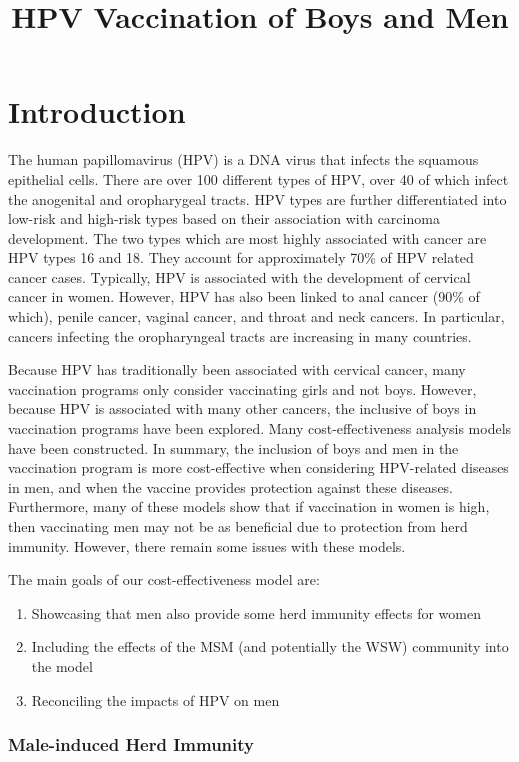 \documentclass[12pt]{article}
\title{HPV Vaccination of Boys and Men}
\begin{document}
\maketitle

\section{Introduction}


The human papillomavirus (HPV) is a DNA virus that infects the squamous epithelial cells.  There are over 100 different types of HPV, over 40 of which infect the anogenital and oropharygeal tracts.  HPV types are further differentiated into low-risk and high-risk types based on their association with carcinoma development.  The two types which are most highly associated with cancer are HPV types 16 and 18.  They account for approximately 70\% of HPV related cancer cases.  Typically, HPV is associated with the development of cervical cancer in women.  However, HPV has also been linked to anal cancer (90\% of which), penile cancer, vaginal cancer, and throat and neck cancers.  In particular, cancers infecting the oropharyngeal tracts are increasing in many countries.  

Because HPV has traditionally been associated with cervical cancer, many vaccination programs only consider vaccinating girls and not boys.  However, because HPV is associated with many other cancers, the inclusive of boys in vaccination programs have been explored. Many cost-effectiveness analysis models have been constructed.  In summary, the inclusion of boys and men in the vaccination program is more cost-effective when considering HPV-related diseases in men, and when the vaccine provides protection against these diseases.  Furthermore, many of these models show that if vaccination in women is high, then vaccinating men may not be as beneficial due to protection from herd immunity.  However, there remain some issues with these models.  

The main goals of our cost-effectiveness model are:
\begin{enumerate}
\item Showcasing that men also provide some herd immunity effects for women
\item Including the effects of the MSM (and potentially the WSW) community into the model
\item Reconciling the impacts of HPV on men
\end{enumerate} 

\subsubsection*{Male-induced Herd Immunity}
\end{document}
